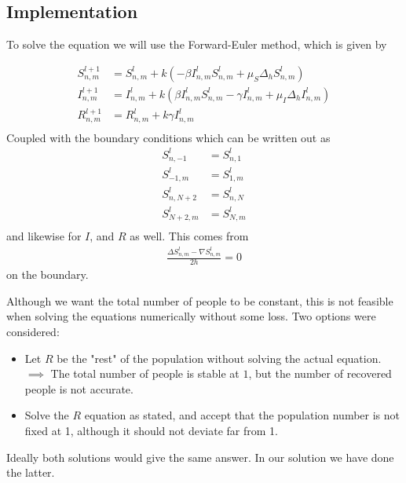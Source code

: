 \subsection{Implementation}
To solve the equation we will use the Forward-Euler method, which is given by

\begin{equation}
    \begin{split}
        S_{n,m}^{l+1} &= S_{n,m}^l + k(-\beta I_{n,m}^l S_{n,m}^l + \mu_S \Delta_h S_{n,m}^l) \\
        I_{n,m}^{l+1} &= I_{n,m}^l + k(\beta I_{n,m}^l S_{n,m}^l - \gamma I_{n,m}^l +  \mu_I \Delta_h I_{n,m}^l) \\
        R_{n,m}^{l+1} &= R_{n,m}^l + k \gamma I_{n,m}^l  \\
    \end{split}
\end{equation}
Coupled with the boundary conditions which can be written out as
\begin{equation}
    \begin{split}
        S_{n,-1}^l &= S_{n, 1}^l \\
        S_{-1,m}^l &= S_{1, m}^l \\
        S_{n,N+2}^l &= S_{n, N}^l \\
        S_{N+2,m}^l &= S_{N, m}^l \\
    \end{split}
\end{equation}
and likewise for $I$, and $R$ as well. This comes from 
\begin{equation}
    \begin{split}
        \frac{\Delta S_{n,m}^l - \nabla S_{n,m}^l}{2h} = 0
    \end{split}
\end{equation}
on the boundary.

Although we want the total number of people to be constant, this is not feasible when solving the equations numerically without some loss. Two options were considered:
\begin{itemize}
    \item Let $R$ be the "rest" of the population without solving the actual equation. $\implies$ The total number of people is stable at $1$, but the number of recovered people is not accurate.
    \item Solve the $R$ equation as stated, and accept that the population number is not fixed at 1, although it should not deviate far from 1.
\end{itemize}
Ideally both solutions would give the same answer.
In our solution we have done the latter.

